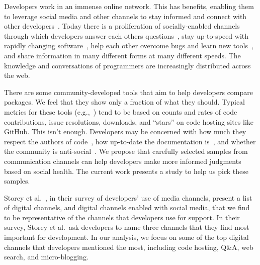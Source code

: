 Developers work in an immense online network.
This has benefits, enabling them to leverage social media and other channels to stay informed and connect with other developers~\cite{singer_software_2014,storey_how_2016}.
Today there is a proliferation of socially-enabled channels~\cite{storey_revolution_2014} through which developers
answer each others questions~\cite{mamykina_fastest_2011},
stay up-to-speed with rapidly changing software~\cite{linares-vasquez_how_2014},
help each other overcome bugs and learn new tools~\cite{parnin_blogging_2013},
and share information in many different forms at many different speeds.
The knowledge and conversations of programmers are increasingly distributed across the web.

There are some community-developed tools that aim to help developers compare packages.
We feel that they show only a fraction of what they should.
Typical metrics for these tools (e.g.,~\cite{awesome_python,ruby_toolbox,package_quality}) tend to be based on counts and rates of code contributions, issue resolutions, downloads, and ``stars'' on code hosting sites like GitHub.
This isn't enough.
Developers may be concerned with how much they respect the authors of code~\cite{robillard_field_2011}, how up-to-date the documentation is~\cite{storey_revolution_2014,nykaza_what_2002,lethbridge_how_2003,robillard_field_2011}, and whether the community is anti-social~\cite{storey_revolution_2014}.
We propose that carefully selected samples from communication channels can help developers make more informed judgments based on social health.
The current work presents a study to help us pick these samples.


Storey et al.~\cite{storey_revolution_2014}, in their survey of developers' use of media channels, present a list of digital channels, and digital channels enabled with social media, that we find to be representative of the channels that developers use for support.
In their survey, Storey et al.\ ask developers to name three channels that they find most important for development.
In our analysis, we focus on some of the top digital channels that developers mentioned the most, including code hosting, Q\&A, web search, and micro-blogging.

